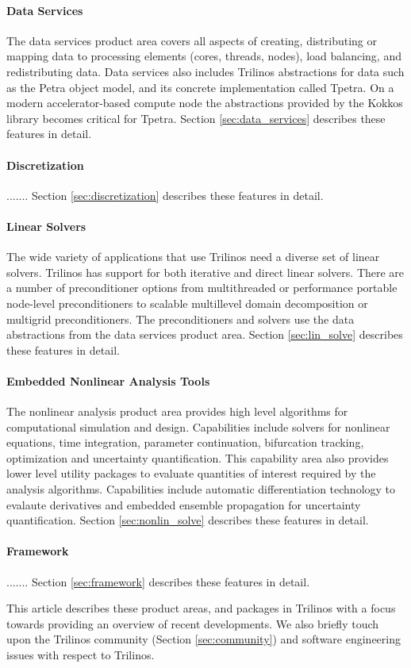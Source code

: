\paragraph{Data Services} The data services product area covers all aspects of creating, distributing or mapping data to processing elements (cores, threads, nodes), load balancing, and redistributing data. Data services also includes Trilinos abstractions for data such as the Petra object model, and its concrete implementation called Tpetra. On a modern accelerator-based compute node the abstractions provided by the Kokkos library becomes critical for Tpetra. Section \ref{sec:data_services} describes these features in detail.
 
\paragraph{Discretization}  ....... Section \ref{sec:discretization} describes these features in detail.


\paragraph{Linear Solvers} The wide variety of applications that use Trilinos need a diverse set of linear solvers. Trilinos has support for both iterative and direct linear solvers. There are a number of preconditioner options from multithreaded or performance portable node-level preconditioners to scalable multillevel domain decomposition or multigrid preconditioners. The preconditioners and solvers use the data abstractions from the data services product area. Section \ref{sec:lin_solve} describes these features in detail.

\paragraph{Embedded Nonlinear Analysis Tools} The nonlinear analysis product area provides high level algorithms for computational simulation and design. Capabilities include solvers for nonlinear equations, time integration, parameter continuation, bifurcation tracking, optimization and uncertainty quantification. This capability area also provides lower level utility packages to evaluate quantities of interest required by the analysis algorithms. Capabilities include automatic differentiation technology to evalaute derivatives and embedded ensemble propagation for uncertainty quantification. Section \ref{sec:nonlin_solve} describes these features in detail.

\paragraph{Framework}  ....... Section \ref{sec:framework} describes these features in detail.

This article describes these product areas, and packages in Trilinos with a focus towards providing an overview of recent developments. We also briefly touch upon the Trilinos community (Section \ref{sec:community}) and software engineering issues with respect to Trilinos.
